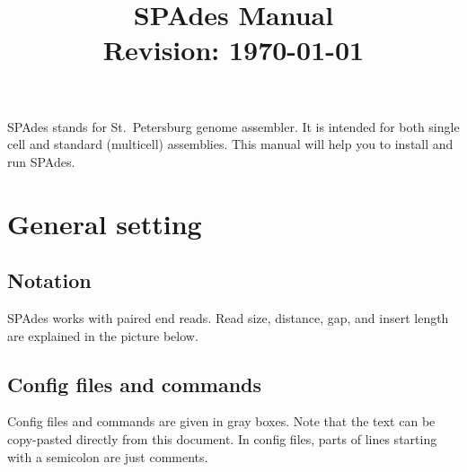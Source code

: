 \documentclass{article}
\def\spades{SPAdes}
\begin{document}
\title{{\spades} Manual\\{\small Revision: \today}}
\date{}
\maketitle

{\spades} stands for St.~Petersburg genome assembler.
It is intended for both single cell and standard (multicell) 
assemblies. This manual will help you to install and run
{\spades}.



\renewcommand{\contentsname}{}
\tableofcontents



\pagebreak

\section{General setting}
\subsection{Notation}
{\spades} works with paired end reads.
Read size, distance, gap, and insert length are 
explained in the picture below.

\begin{center}
\end{center}

\subsection{Config files and commands}
Config files and commands are given in gray boxes. 
Note that the text can be copy-pasted directly from this document.
In config files, parts of lines starting with a semicolon are just comments.
\end{document}
